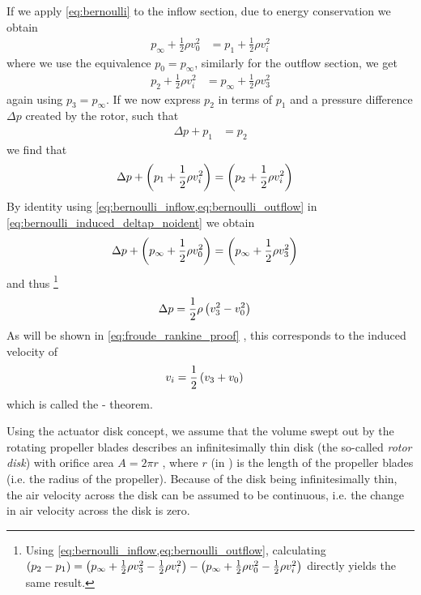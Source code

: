 If we apply \cref{eq:bernoulli} to the inflow section, due to energy conservation we obtain
%
\begin{align}
p_\infty + \frac{1}{2} \rho v^2_0 &= p_1 + \frac{1}{2} \rho v^2_i \label{eq:bernoulli_inflow}
\end{align}
%
where we use the equivalence $p_0 = p_\infty$, similarly for the outflow section, we get
%
\begin{align}
p_2 + \frac{1}{2} \rho v^2_i &= p_\infty + \frac{1}{2} \rho v^2_3 \label{eq:bernoulli_outflow}
\end{align}
%
again using $p_3 = p_\infty$.
If we now express $p_2$ in terms of $p_1$ and a pressure difference $\Delta p$ created by the rotor, such that
\begin{align}
\Delta p + p_1 &= p_2
\end{align}
%
we find that
%
\begin{align}
\Delta p + \left( p_1 + \frac{1}{2} \rho v^2_i \right) &= \left(  p_2 + \frac{1}{2} \rho v^2_i \right) \label{eq:bernoulli_induced_deltap_noident}
\end{align}
%
By identity using \cref{eq:bernoulli_inflow,eq:bernoulli_outflow} in \cref{eq:bernoulli_induced_deltap_noident} we obtain
%
\begin{align}
\Delta p + \left( p_\infty + \frac{1}{2} \rho v^2_0 \right) &= \left( p_\infty + \frac{1}{2} \rho v^2_3 \right) \label{eq:bernoulli_induced_deltap}
\end{align}
%
and thus%
\footnote{Using \cref{eq:bernoulli_inflow,eq:bernoulli_outflow}, calculating
$\left( p_2 - p_1 \right) = \left(p_\infty + \frac{1}{2} \rho v^2_3 - \frac{1}{2} \rho v^2_i\right) - \left( p_\infty + \frac{1}{2} \rho v^2_0 - \frac{1}{2} \rho v^2_i\right)$ directly yields the same result.
}
%
\begin{align}
\Delta p &= \frac{1}{2} \rho \left( v^2_3 - v^2_0 \right) \label{eq:pressure_difference_v3}
\end{align}
%
As will be shown in \cref{eq:froude_rankine_proof} , this corresponds to the induced velocity of
%
\begin{align}
v_i &= \frac{1}{2} \left( v_3 + v_0 \right) \label{eq:froude_rankine_theorem}
\end{align}
%
which is called the - theorem.

Using the actuator disk concept, we assume that the volume swept out by the rotating propeller blades describes an infinitesimally thin disk (the so-called \textit{rotor disk}) with orifice area $A = 2\pi r$%
, where $r$ (in \withunit{\metre}) is the length of the propeller blades (i.e. the radius of the propeller).
Because of the disk being infinitesimally thin, the air velocity across the disk can be assumed to be continuous, i.e. the change in air velocity across the disk is zero. 

